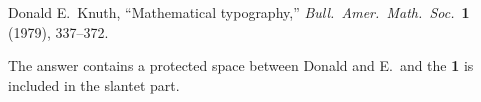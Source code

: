 Donald E.\ Knuth, ``Mathematical typography,'' {\sl Bull.\ Amer.\ Math.\ Soc.}\ {\bf 1} (1979), 337--372.

The answer contains a protected space between Donald and E.\ and the {\bf 1} is included in the slantet part.
